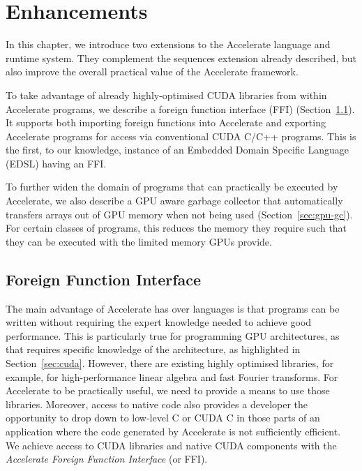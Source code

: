 \chapter{Enhancements}
\label{chap:enhancements}

In this chapter, we introduce two extensions to the Accelerate language and runtime system. They complement the sequences extension already described, but also improve the overall practical value of the Accelerate framework.

To take advantage of already highly-optimised CUDA libraries from within Accelerate programs, we describe a foreign function interface (FFI) (Section~\ref{sec:foreign}). It supports both importing foreign functions into Accelerate and exporting Accelerate programs for access via conventional CUDA C/C++ programs. This is the first, to our knowledge, instance of an Embedded Domain Specific Language (EDSL) having an FFI.

To further widen the domain of programs that can practically be executed by Accelerate, we also describe a GPU aware garbage collector that automatically transfers arrays out of GPU memory when not being used (Section~\ref{sec:gpu-gc}). For certain classes of programs, this reduces the memory they require such that they can be executed with the limited memory GPUs provide.


\section{Foreign Function Interface}
\label{sec:foreign}


The main advantage of Accelerate has over languages is that programs can be written without requiring the expert knowledge needed to achieve good performance. This is particularly true for programming GPU architectures, as that requires specific knowledge of the architecture, as highlighted in Section~\ref{sec:cuda}. However, there are existing highly optimised libraries, for example, for high-performance linear algebra and fast Fourier transforms. For Accelerate to be practically useful, we need to provide a means to use those libraries. Moreover, access to native code also provides a developer the opportunity to drop down to low-level C or CUDA C in those parts of an application where the code generated by Accelerate is not sufficiently efficient. We achieve access to CUDA libraries and native CUDA components with the \emph{Accelerate Foreign Function Interface} (or FFI).

